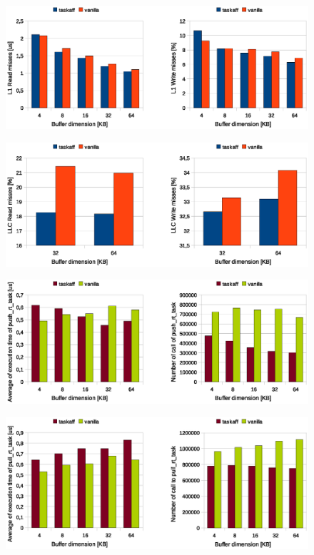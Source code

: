 \begin{figure}[htbp]
\centering
\includegraphics[width=\widefigure]{images/results_i7/l1_load_store_i7.eps}
\caption{}
\label{fig:l1_load_store_i7}
\end{figure}

\begin{figure}[htbp]
\centering
\includegraphics[width=\widefigure]{images/results_i7/l3_load_store_i7.eps}
\caption{}
\label{fig:l2_load_store_i7}
\end{figure}

\begin{figure}[htbp]
\centering
\includegraphics[width=\widefigure]{images/results_i7/push_i7.eps}
\caption{}
\label{fig:push_i7}
\end{figure}

\begin{figure}[htbp]
\centering
\includegraphics[width=\widefigure]{images/results_i7/pull_i7.eps}
\caption{}
\label{fig:pull_i7}
\end{figure}

